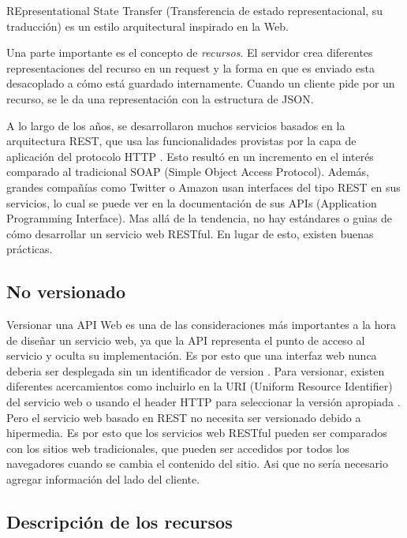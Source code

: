REpresentational State Transfer (Transferencia de estado representacional, su traducción) es un estilo arquitectural inspirado en la Web. 

Una parte importante es el concepto de \textit{recursos}. 
El servidor crea diferentes representaciones del recurso en un request y la forma en que es enviado esta desacoplado a cómo está guardado internamente. Cuando un cliente pide por un recurso, se le da una representación con la estructura de JSON.

A lo largo de los años, se desarrollaron muchos servicios basados en la arquitectura REST, que usa las funcionalidades provistas por la capa de aplicación del protocolo HTTP \cite{RestSoap} \cite{IETF}. Esto resultó en un incremento en el interés comparado al tradicional SOAP (Simple Object Access Protocol). Además, grandes compañías como Twitter o Amazon usan interfaces del tipo REST en sus servicios, lo cual se puede ver en la documentación de sus APIs (Application Programming Interface).
Mas allá de la tendencia, no hay estándares o guias de cómo desarrollar un servicio web RESTful. En lugar de esto, existen buenas prácticas.

\subsection[No versionado]{No versionado}

Versionar una API Web es una de las consideraciones más importantes a la hora de diseñar un servicio web, ya que la API representa el punto de acceso al servicio y oculta su implementación. Es por esto que una interfaz web nunca deberia ser desplegada sin un identificador de version \cite{WAPID}. Para versionar, existen diferentes acercamientos como incluirlo en la URI (Uniform Resource Identifier) del servicio web o usando el header HTTP para seleccionar la versión apropiada \cite{WAPID}. Pero el servicio web basado en REST no necesita ser versionado debido a hipermedia. Es por esto que los servicios web RESTful pueden ser comparados con los sitios web tradicionales, que pueden ser accedidos por todos los navegadores cuando se cambia el contenido del sitio. Asi que no sería necesario agregar información del lado del cliente.


\subsection[Descripción de los recursos]{Descripción de los recursos}

